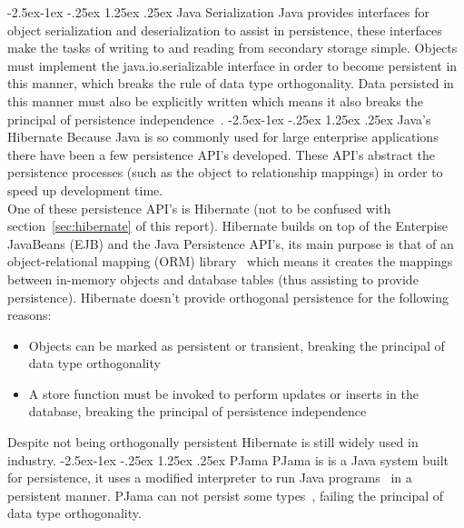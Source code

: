 \documentclass[a4paper,12pt]{article}
\makeatletter
\renewcommand\paragraph{\@startsection{paragraph}{4}{\z@}%
{-2.5ex\@plus -1ex \@minus -.25ex}%
{1.25ex \@plus .25ex}%
{\normalfont\normalsize\bfseries}}
\makeatother
\begin{document}
\paragraph{Java Serialization}
Java provides interfaces for object serialization and deserialization to assist in persistence, these interfaces make the tasks of writing to and reading from secondary storage simple. Objects must implement the java.io.serializable interface in order to become persistent in this manner, which breaks the rule of data type orthogonality. Data persisted in this manner must also be explicitly written which means it also breaks the principal of persistence independence~\citep{ADearle}.
\paragraph{Java's Hibernate}
Because Java is so commonly used for large enterprise applications~\citep{persistenceandjava} there have been a few persistence API's developed. These API's abstract the persistence processes (such as the object to relationship mappings) in order to speed up development time. 
\\One of these persistence API's is Hibernate (not to be confused with section~\ref{sec:hibernate} of this report). Hibernate builds on top of the Enterpise JavaBeans (EJB) and the Java Persistence API's, its main purpose is that of an object-relational mapping (ORM) library~\citep{hibernateORM} which means it creates the mappings between in-memory objects and database tables (thus assisting to provide persistence). Hibernate doesn't provide orthogonal persistence for the following reasons:
\begin{itemize}
    \item{Objects can be marked as persistent or transient, breaking the principal of data type orthogonality}
    \item{A store function must be invoked to perform updates or inserts in the database, breaking the principal of persistence independence}
\end{itemize}
Despite not being orthogonally persistent Hibernate is still widely used in industry.
\paragraph{PJama}\label{sec:pjama}
PJama is is a Java system built for persistence, it uses a modified interpreter to run Java programs~\citep{persistentjavasystem} in a persistent manner. PJama can not persist some types~\citep{ADearle}, failing the principal of data type orthogonality. 
\end{document}
